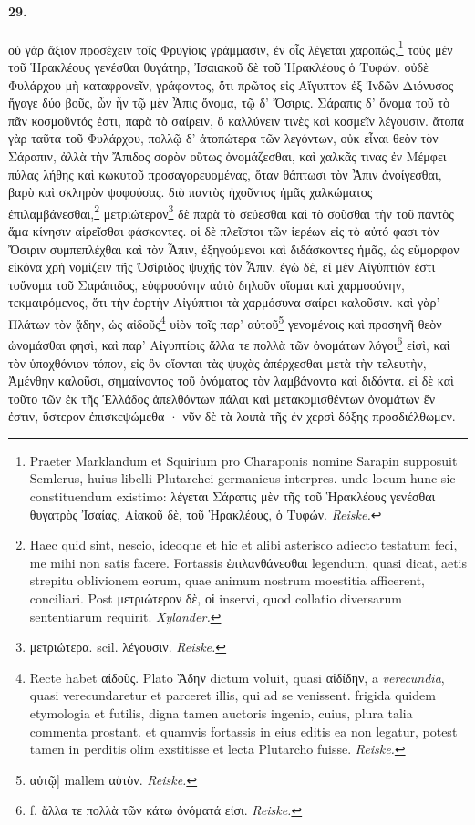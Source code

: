 \documentclass[a4paper, 11pt, oneside, polutonikogreek, german]{article}
\begin{document}
\paragraph{29.}
οὐ γὰρ ἄξιον προσέχειν τοῖς Φρυγίοις γράμμασιν, ἐν οἷς λέγεται χαροπῶς,\footnote{Praeter Marklandum et Squirium pro Charaponis nomine Sarapin supposuit Semlerus, huius libelli Plutarchei germanicus interpres. unde locum hunc sic constituendum existimo: λέγεται Σάραπις μὲν τῆς τοῦ Ἡρακλέους γενέσθαι θυγατρὸς Ἰσαίας, Αἰακοῦ δὲ, τοῦ Ἡρακλέους, ὁ Τυφών. \emph{Reiske.}} τοὺς μὲν τοῦ Ἡρακλέους γενέσθαι θυγάτηρ, Ἰσαιακοῦ δὲ τοῦ Ἡρακλέους ὁ Τυφών. οὐδὲ Φυλάρχου μὴ καταφρονεῖν, γράφοντος, ὅτι πρῶτος εἰς Αἴγυπτον ἐξ Ἰνδῶν Διόνυσος ἤγαγε δύο βοῦς, ὧν ἦν τῷ μὲν Ἆπις ὄνομα, τῷ δ' Ὄσιρις. Σάραπις δ' ὄνομα τοῦ τὸ πᾶν κοσμοῦντός ἐστι, παρὰ τὸ σαίρειν, ὃ καλλύνειν τινὲς καὶ κοσμεῖν λέγουσιν. ἄτοπα γὰρ ταῦτα τοῦ Φυλάρχου, πολλῷ δ' ἀτοπώτερα τῶν λεγόντων, οὐκ εἶναι θεὸν τὸν Σάραπιν, ἀλλὰ τὴν Ἄπιδος σορὸν οὕτως ὀνομάζεσθαι, καὶ χαλκᾶς τινας ἐν Μέμφει πύλας λήθης καὶ κωκυτοῦ προσαγορευομένας, ὅταν θάπτωσι τὸν Ἆπιν ἀνοίγεσθαι, βαρὺ καὶ σκληρὸν ψοφούσας. διὸ παντὸς ἠχοῦντος ἡμᾶς χαλκώματος ἐπιλαμβάνεσθαι,\footnote{Haec quid sint, nescio, ideoque et hic et alibi asterisco adiecto testatum feci, me mihi non satis facere. Fortassis ἐπιλανθάνεσθαι legendum, quasi dicat, aetis strepitu oblivionem eorum, quae animum nostrum moestitia afficerent, conciliari. Post μετριώτερον δὲ, οἱ inservi, quod collatio diversarum sententiarum requirit. \emph{Xylander.}} μετριώτερον\footnote{μετριώτερα. scil. λέγουσιν. \emph{Reiske.}} δὲ παρὰ τὸ σεύεσθαι καὶ τὸ σοῦσθαι τὴν τοῦ παντὸς ἅμα κίνησιν αἱρεῖσθαι φάσκοντες. οἱ δὲ πλεῖστοι τῶν ἱερέων εἰς τὸ αὐτό φασι τὸν Ὄσιριν συμπεπλέχθαι καὶ τὸν Ἆπιν, ἐξηγούμενοι καὶ διδάσκοντες ἡμᾶς, ὡς εὔμορφον εἰκόνα χρὴ νομίζειν τῆς Ὀσίριδος ψυχῆς τὸν Ἆπιν. ἐγὼ δὲ, εἰ μὲν Αἰγύπτιόν ἐστι τοὔνομα τοῦ Σαράπιδος, εὐφροσύνην αὐτὸ δηλοῦν οἴομαι καὶ χαρμοσύνην, τεκμαιρόμενος, ὅτι τὴν ἑορτὴν Αἰγύπτιοι τὰ χαρμόσυνα σαίρει καλοῦσιν. καὶ γὰρ' Πλάτων τὸν ᾅδην, ὡς αἰδοῦς\footnote{Recte habet αἰδοῦς. Plato Ἅδην dictum voluit, quasi αἰδίδην, a \emph{verecundia}, quasi verecundaretur et parceret illis, qui ad se venissent. frigida quidem etymologia et futilis, digna tamen auctoris ingenio, cuius, plura talia commenta prostant. et quamvis fortassis in eius editis ea non legatur, potest tamen in perditis olim exstitisse et lecta Plutarcho fuisse. \emph{Reiske.}} υἱὸν τοῖς παρ' αὐτοῦ\footnote{αὐτῷ] mallem αὐτὸν. \emph{Reiske.}} γενομένοις καὶ προσηνῆ θεὸν ὠνομάσθαι φησὶ, καὶ παρ' Αἰγυπτίοις ἄλλα τε πολλὰ τῶν ὀνομάτων λόγοι\footnote{f. ἄλλα τε πολλὰ τῶν κάτω ὀνόματά εἰσι. \emph{Reiske.}} εἰσὶ, καὶ τὸν ὑποχθόνιον τόπον, εἰς ὃν οἴονται τὰς ψυχὰς ἀπέρχεσθαι μετὰ τὴν τελευτὴν, Ἀμένθην καλοῦσι, σημαίνοντος τοῦ ὀνόματος τὸν λαμβάνοντα καὶ διδόντα. εἰ δὲ καὶ τοῦτο τῶν ἐκ τῆς Ἑλλάδος ἀπελθόντων πάλαι καὶ μετακομισθέντων ὀνομάτων ἕν ἐστιν, ὕστερον ἐπισκεψώμεθα · νῦν δὲ τὰ λοιπὰ τῆς ἐν χερσὶ δόξης προσδιέλθωμεν.
\end{document}
